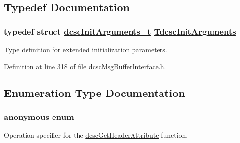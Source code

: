 \subsection{Typedef Documentation}
\hypertarget{group__dcsc__msg__buffer__access_gc35123ecbeaf4345c7ea161d1d31b500}{
\subsubsection[TdcscInitArguments]{\setlength{\rightskip}{0pt plus 5cm}typedef struct \hyperlink{structdcscInitArguments__t}{dcsc\-Init\-Arguments\_\-t} \hyperlink{structdcscInitArguments__t}{Tdcsc\-Init\-Arguments}}}
\label{group__dcsc__msg__buffer__access_gc35123ecbeaf4345c7ea161d1d31b500}


Type definition for extended initialization parameters. 



Definition at line 318 of file dcsc\-Msg\-Buffer\-Interface.h.

\subsection{Enumeration Type Documentation}
\hypertarget{group__dcsc__msg__buffer__access_g0411cd49bb5b71852cecd93bcbf0ca2d}{
\subsubsection["@7]{\setlength{\rightskip}{0pt plus 5cm}anonymous enum}}
\label{group__dcsc__msg__buffer__access_g0411cd49bb5b71852cecd93bcbf0ca2d}


Operation specifier for the \hyperlink{group__dcsc__msg__buffer__access_g975e68b162a4d0786e1902c895349b02}{dcsc\-Get\-Header\-Attribute} function. 

